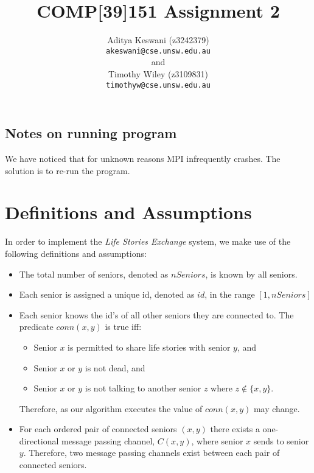 \documentclass[12pt,a4paper]{scrartcl}
\begin{document}
\title{COMP[39]151 Assignment 2}
\author{Aditya Keswani (z3242379) \\ 
        \texttt{akeswani@cse.unsw.edu.au} \\ 
        and \\ 
        Timothy Wiley (z3109831) \\
        \texttt{timothyw@cse.unsw.edu.au} }

\maketitle

\tableofcontents

\subsection{Notes on running program}
We have noticed that for unknown reasons MPI infrequently crashes.
The solution is to re-run the program.

\section{Definitions and Assumptions}
In order to implement the \emph{Life Stories Exchange} system, we make use of the following definitions and assumptions:
\begin{itemize}
    \item The total number of seniors, denoted as $nSeniors$, is known by all seniors.
    \item Each senior is assigned a unique id, denoted as $id$, in the range $[1,nSeniors]$
    \item Each senior knows the id's of all other seniors they are connected to.
          The predicate $conn(x,y)$ is true iff:
          \begin{itemize}
              \item Senior $x$ is permitted to share life stories with senior $y$, and
              \item Senior $x$ or $y$ is not dead, and
              \item Senior $x$ or $y$ is not talking to another senior $z$ where $z \notin \{x,y\}$.
          \end{itemize}
          Therefore, as our algorithm executes the value of $conn(x,y)$ may change.
    \item For each ordered pair of connected seniors $(x,y)$ there exists a one-directional message passing channel, $C(x,y)$, where senior $x$ sends to senior $y$.
          Therefore, two message passing channels exist between each pair of connected seniors.
\end{itemize}
\end{document}

